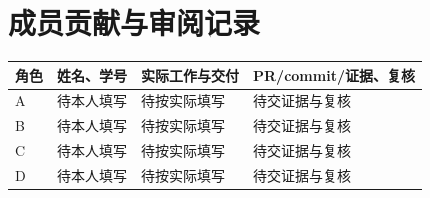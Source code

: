 \section{成员贡献与审阅记录}
\begin{longtable}{p{.12\linewidth}p{.20\linewidth}p{.28\linewidth}p{.25\linewidth}}
\toprule 角色 & 姓名、学号 & 实际工作与交付 & PR/commit/证据、复核\\\midrule
\endhead
A & 待本人填写 & 待按实际填写 & 待交证据与复核\\
B & 待本人填写 & 待按实际填写 & 待交证据与复核\\
C & 待本人填写 & 待按实际填写 & 待交证据与复核\\
D & 待本人填写 & 待按实际填写 & 待交证据与复核\\\bottomrule
\end{longtable}
